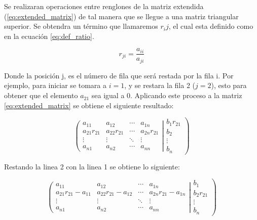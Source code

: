 Se realizaran operaciones entre renglones de la matriz extendida (\ref{eq:extended_matrix}) de tal manera que se llegue a una matriz triangular superior. Se obtendra un término que llamaremos $r_ij$, el cual esta definido como en la ecuación \ref{eq:def_ratio}.

\begin{equation}
    r_{ji} = \frac{a_{ii}}{a_{ji}}
    \label{eq:def_ratio}
\end{equation}

Donde la posición j, es el número de fila que será restada por la fila i. Por ejemplo, para iniciar se tomara a $i=1$, y se restara la fila 2 ($j=2$), esto para obtener que el elemento $a_{21}$ sea igual a 0. Aplicando este proceso a la matriz \ref{eq:extended_matrix} se obtiene el siguiente resultado:

\begin{equation*}
    \left(\begin{matrix}
        a_{11}       & a_{12}       & \cdots & a_{1n}       \\
        a_{21}r_{21} & a_{22}r_{21} & \cdots & a_{2n}r_{21} \\
        \vdots       & \vdots       & \ddots & \vdots       \\
        a_{n1}       & a_{n2}       & \cdots & a_{nn}
    \end{matrix}\right| \left.
    \begin{matrix}
        b_1r_{21} \\
        b_2       \\
        \vdots    \\
        b_n
    \end{matrix}
    \right)
\end{equation*}

Restando la linea 2 con la linea 1 se obtiene lo siguiente:

\begin{equation*}
    \left(\begin{matrix}
        a_{11}              & a_{12}              & \cdots & a_{1n}              \\
        a_{21}r_{21}-a_{11} & a_{22}r_{21}-a_{12} & \cdots & a_{2n}r_{21}-a_{1n} \\
        \vdots              & \vdots              & \ddots & \vdots              \\
        a_{n1}              & a_{n2}              & \cdots & a_{nn}
    \end{matrix}\right| \left.
    \begin{matrix}
        b_1       \\
        b_2r_{21} \\
        \vdots    \\
        b_n
    \end{matrix}
    \right)
\end{equation*}

